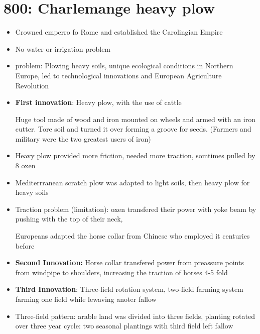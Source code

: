 \documentclass{article}
\begin{document}
\section*{800: Charlemange \rightarrow{} heavy plow}
\begin{itemize}
  \item Crowned emperro fo Rome and established the Carolingian Empire
  \item No water or irrigation problem
  \item problem: Plowing heavy soils,
    unique ecological conditions in Northern Europe, led to technological innovations
    and European Agriculture Revolution
  \item \textbf{First innovation}: Heavy plow, with the use of cattle

    Huge tool made of wood and iron mounted on wheels and armed with an iron cutter.
    Tore soil and turned it over forming a groove for seeds.
    (Farmers and military were the two greatest users of iron)
  \item Heavy plow provided more friction, needed more traction,
    somtimes pulled by 8 oxen
  \item Mediterrranean scratch plow was adapted to light soils, then heavy plow for heavy soils
  \item Traction problem (limitation): oxen transfered their power
    with yoke beam by pushing with the top of their neck,

    Europeans adapted the horse collar from Chinese who employed it centuries before
  \item \textbf{Second Innovation:} Horse collar transfered power from preassure points from windpipe to shoulders,
    increasing the traction of horses 4-5 fold
  \item \textbf{Third Innovation}: Three-field rotation system,
    two-field farming system farming one field while lewaving anoter fallow
  \item Three-field pattern: arable land was divided into three fields, planting rotated over
    three year cycle: two seasonal plantings with third field left fallow
\end{itemize}
\end{document}
